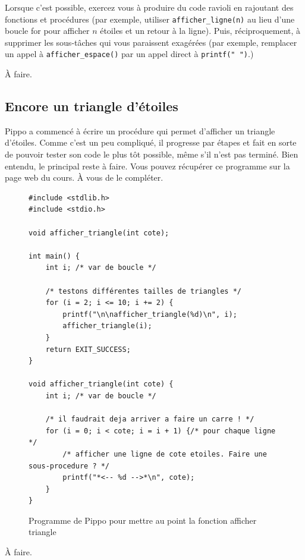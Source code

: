 Lorsque c'est possible, exercez vous à produire du code ravioli en
rajoutant des fonctions et procédures (par exemple, utiliser \verb+afficher_ligne(n)+
au lieu d'une boucle for pour afficher $n$ étoiles et un retour à la ligne). Puis, réciproquement, à
supprimer les sous-tâches qui vous paraissent exagérées (par exemple, remplacer un appel
à \verb+afficher_espace()+ par un appel direct à \verb+printf(" ")+.)

\begin{correction}
À faire.
\end{correction}

\subsection{Encore un triangle d'étoiles}
Pippo a commencé à écrire un procédure qui permet d'afficher un
triangle d'étoiles. Comme c'est un peu compliqué, il progresse par étapes
et fait en sorte de pouvoir tester son code le plus tôt possible, même
s'il n'est pas terminé.  Bien entendu, le principal reste à
faire. Vous pouvez récupérer ce programme sur la page web du cours. À vous de
le compléter. 

\begin{figure}[tb]
  \begin{small}
\begin{verbatim}
#include <stdlib.h>
#include <stdio.h>

void afficher_triangle(int cote);

int main() {
    int i; /* var de boucle */

    /* testons différentes tailles de triangles */
    for (i = 2; i <= 10; i += 2) {
        printf("\n\nafficher_triangle(%d)\n", i);
        afficher_triangle(i);
    }
    return EXIT_SUCCESS;
} 

void afficher_triangle(int cote) {
    int i; /* var de boucle */

    /* il faudrait deja arriver a faire un carre ! */
    for (i = 0; i < cote; i = i + 1) {/* pour chaque ligne */
        /* afficher une ligne de cote etoiles. Faire une sous-procedure ? */
        printf("*<-- %d -->*\n", cote);
    }
}
\end{verbatim}
\vspace{-0.5cm}
  \end{small}
  \caption{Programme de Pippo pour mettre au point la fonction afficher triangle}
\label{fig:triangle}
\end{figure}

\begin{correction}
À faire.
\end{correction}



